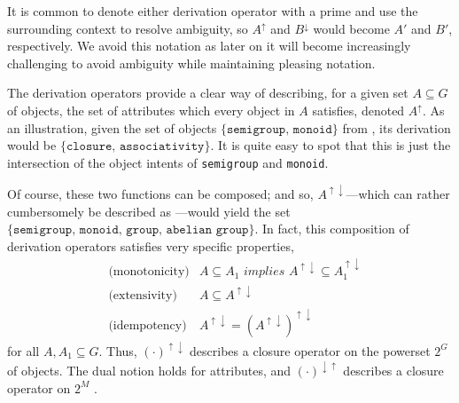 It is common to denote either derivation operator with a prime and use the surrounding context to resolve ambiguity, so $A^\uparrow$ and $B^\downarrow$ would become $A'$ and $B'$, respectively. We avoid this notation as later on it will become increasingly challenging to avoid ambiguity while maintaining pleasing notation.

The derivation operators provide a clear way of describing, for a given set $A\subseteq G$ of objects, the set of attributes which every object in $A$ satisfies, denoted $A^\uparrow$. As an illustration, given the set of objects $\{\texttt{semigroup, monoid}\}$ from , its derivation would be $\{\texttt{closure, associativity}\}$. It is quite easy to spot that this is just the intersection of the object intents of \texttt{semigroup} and \texttt{monoid}.

Of course, these two functions can be composed; and so, $A^{\uparrow \downarrow}$---which can rather cumbersomely be described as ---would yield the set $\{\texttt{semigroup, monoid, group, abelian group}\}$. In fact, this composition of derivation operators satisfies very specific properties, 
\begin{align}
  & \text{(monotonicity)} & A \subseteq A_1 \textit{ implies } A^{\uparrow \downarrow} \subseteq A_1^{\uparrow \downarrow} \\
  & \text{(extensivity)}  & A \subseteq A^{\uparrow \downarrow} \\
  & \text{(idempotency)}  & A^{\uparrow \downarrow} = (A^{\uparrow \downarrow})^{\uparrow \downarrow}
\end{align}
for all $A, A_1 \subseteq G$. Thus, $(\cdot)^{\uparrow \downarrow}$ describes a closure operator on the powerset $2^G$ of objects. The dual notion holds for attributes, and $(\cdot)^{\downarrow \uparrow}$ describes a closure operator on $2^M$ \cite[pp. 18]{ganter1999formal}.

